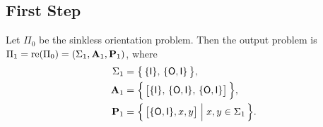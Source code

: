 \subsection{First Step}

\begin{lemma}
	Let $\Pi_0$ be the sinkless orientation problem. Then the output problem is $\Pi_1 = \operatorname{re}(\Pi_0) = (\Sigma_1, \mathbf{A}_1, \mathbf{P}_1)$, where
	\begin{align*}
		\Sigma_1 &= \bigl\{ \, \{ \mathsf{I} \},\, \{ \mathsf{O}, \mathsf{I} \} \, \bigr\}, \\
		\mathbf{A}_1 &= \Bigl\{ \, \bigl[\{ \mathsf{I} \},\, \{ \mathsf{O}, \mathsf{I} \},\, \{ \mathsf{O}, \mathsf{I} \} \bigr] \, \Bigr\}, \\
		\mathbf{P}_1 &= \Bigl\{ \, \bigl[\{ \mathsf{O}, \mathsf{I} \}, x, y\bigr] \Bigm| x,y \in \Sigma_1 \, \Bigr\}.
	\end{align*}
\end{lemma}

